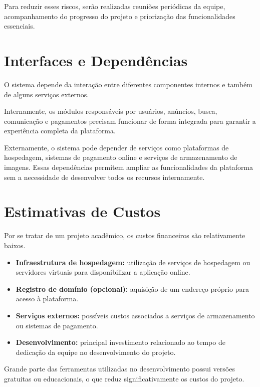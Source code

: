 \documentclass[a4paper,12pt]{article}
\begin{document}
Para reduzir esses riscos, serão realizadas reuniões periódicas da equipe, acompanhamento do progresso do projeto e priorização das funcionalidades essenciais.

\section{Interfaces e Dependências}

O sistema depende da interação entre diferentes componentes internos e também de alguns serviços externos.

Internamente, os módulos responsáveis por usuários, anúncios, busca, comunicação e pagamentos precisam funcionar de forma integrada para garantir a experiência completa da plataforma.

Externamente, o sistema pode depender de serviços como plataformas de hospedagem, sistemas de pagamento online e serviços de armazenamento de imagens. Essas dependências permitem ampliar as funcionalidades da plataforma sem a necessidade de desenvolver todos os recursos internamente.

\section{Estimativas de Custos}

Por se tratar de um projeto acadêmico, os custos financeiros são relativamente baixos.

\begin{itemize}
    \item \textbf{Infraestrutura de hospedagem:} utilização de serviços de hospedagem ou servidores virtuais para disponibilizar a aplicação online.

    \item \textbf{Registro de domínio (opcional):} aquisição de um endereço próprio para acesso à plataforma.

    \item \textbf{Serviços externos:} possíveis custos associados a serviços de armazenamento ou sistemas de pagamento.

    \item \textbf{Desenvolvimento:} principal investimento relacionado ao tempo de dedicação da equipe no desenvolvimento do projeto.
\end{itemize}

Grande parte das ferramentas utilizadas no desenvolvimento possui versões gratuitas ou educacionais, o que reduz significativamente os custos do projeto.
\end{document}
